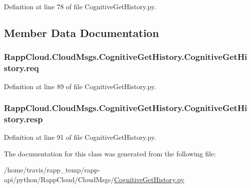Definition at line 78 of file Cognitive\-Get\-History.\-py.



\subsection{Member Data Documentation}
\hypertarget{classRappCloud_1_1CloudMsgs_1_1CognitiveGetHistory_1_1CognitiveGetHistory_a6c43243c69037f68215661add0ac83fc}{
\subsubsection[{req}]{\setlength{\rightskip}{0pt plus 5cm}Rapp\-Cloud.\-Cloud\-Msgs.\-Cognitive\-Get\-History.\-Cognitive\-Get\-History.\-req}}\label{classRappCloud_1_1CloudMsgs_1_1CognitiveGetHistory_1_1CognitiveGetHistory_a6c43243c69037f68215661add0ac83fc}


Definition at line 89 of file Cognitive\-Get\-History.\-py.

\hypertarget{classRappCloud_1_1CloudMsgs_1_1CognitiveGetHistory_1_1CognitiveGetHistory_a88c6a6e9c94af7529dfc6d7aa562f068}{
\subsubsection[{resp}]{\setlength{\rightskip}{0pt plus 5cm}Rapp\-Cloud.\-Cloud\-Msgs.\-Cognitive\-Get\-History.\-Cognitive\-Get\-History.\-resp}}\label{classRappCloud_1_1CloudMsgs_1_1CognitiveGetHistory_1_1CognitiveGetHistory_a88c6a6e9c94af7529dfc6d7aa562f068}


Definition at line 91 of file Cognitive\-Get\-History.\-py.



The documentation for this class was generated from the following file\-:\begin{DoxyCompactItemize}
\item 
/home/travis/rapp\-\_\-temp/rapp-\/api/python/\-Rapp\-Cloud/\-Cloud\-Msgs/\hyperlink{CognitiveGetHistory_8py}{Cognitive\-Get\-History.\-py}\end{DoxyCompactItemize}
